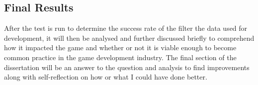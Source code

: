 \documentclass[twocolumn, 10pt, conference]{ieeetran}
\begin{document}
\subsection{Final Results}
After the test is run to determine the success rate of the filter the data used for development, it will then be analysed and further discussed briefly to comprehend how it impacted the game and whether or not it is viable enough to become common practice in the game development industry. The final section of the dissertation will be an answer to the question and analysis to find improvements along with self-reflection on how or what I could have done better.



\end{document}
